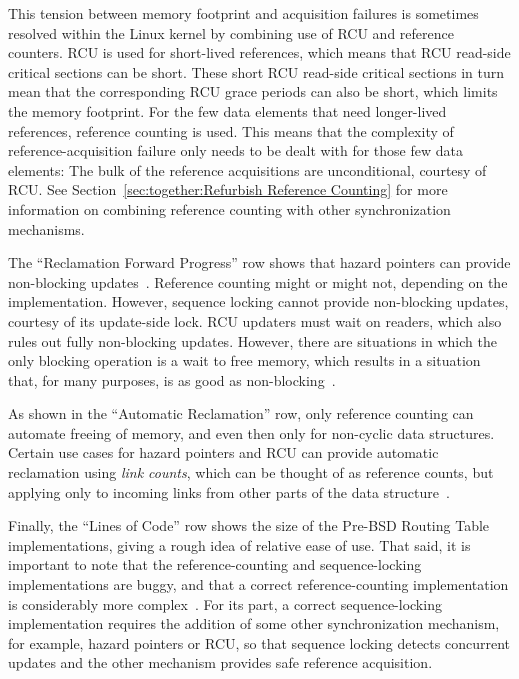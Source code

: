 This tension between memory footprint and acquisition
failures is sometimes resolved within the Linux kernel by combining use
of RCU and reference counters.
RCU is used for short-lived references, which means that RCU read-side
critical sections can be short.
These short RCU read-side critical sections in turn mean that the corresponding
RCU grace periods can also be short, which limits the memory footprint.
For the few data elements that need longer-lived references, reference
counting is used.
This means that the complexity of reference-acquisition failure only
needs to be dealt with for those few data elements:  The bulk of
the reference acquisitions are unconditional, courtesy of RCU\@.
See Section~\ref{sec:together:Refurbish Reference Counting}
for more information on combining reference counting with other
synchronization mechanisms.

The ``Reclamation Forward Progress'' row shows that hazard pointers
can provide non-blocking updates~\cite{MagedMichael04a,HerlihyLM02}.
Reference counting might or might not, depending on the implementation.
However, sequence locking cannot provide non-blocking updates, courtesy
of its update-side lock.
RCU updaters must wait on readers, which also rules out fully non-blocking
updates.
However, there are situations in which the only blocking operation is
a wait to free memory, which results in a situation that, for many
purposes, is as good as non-blocking~\cite{MathieuDesnoyers2012URCU}.

As shown in the ``Automatic Reclamation'' row, only reference
counting can automate freeing of memory, and even then only
for non-cyclic data structures.
Certain use cases for hazard pointers and RCU can provide automatic
reclamation using \emph{link counts}, which can be thought of as
reference counts, but applying only to incoming links from other
parts of the data structure~\cite{MagedMichael2018FollyHazptr}.

Finally, the ``Lines of Code'' row shows the size of the Pre-BSD
Routing Table implementations, giving a rough idea of relative ease of use.
That said, it is important to note that the reference-counting and
sequence-locking implementations are buggy, and that a correct
reference-counting implementation is considerably
more complex~\cite{Valois95a,MagedMichael95a}.
For its part, a correct sequence-locking implementation requires
the addition of some other synchronization mechanism, for example,
hazard pointers or RCU, so that sequence locking detects concurrent
updates and the other mechanism provides safe reference acquisition.

